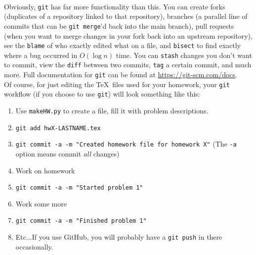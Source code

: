 \documentclass[a4paper,10pt]{article}
\begin{document}
\\[10pt]
Obviously, \texttt{git} has far more functionality than this. You can create forks (duplicates of a repository linked to that repository), branches (a parallel line of commits that can be \texttt{git merge}'d back into the main branch), pull requests (when you want to merge changes in your fork back into an upstream repository), see the \texttt{blame} of who exactly edited what on a file, and \texttt{bisect} to find exactly where a bug occurred in $O(\log n)$ time. You can \texttt{stash} changes you don't want to commit, view the \texttt{diff} between two commits, \texttt{tag} a certain commit, and much more. Full documentation for \texttt{git} can be found at \url{https://git-scm.com/docs}.
\\[10pt]
Of course, for just editing the \TeX\ files used for your homework, your \texttt{git} workflow (if you choose to use \texttt{git}) will look something like this:

\begin{enumerate}
	\item Use \texttt{makeHW.py} to create a file, fill it with problem descriptions.
	\item \texttt{git add hwX-LASTNAME.tex}
	\item \texttt{git commit -a -m "Created homework file for homework X"} (The \texttt{-a} option means commit \emph{all} changes)
	\item Work on homework
	\item \texttt{git commit -a -m "Started problem 1"}
	\item Work some more
	\item \texttt{git commit -a -m "Finished problem 1"}
	\item Etc...If you use GitHub, you will probably have a \texttt{git push} in there occasionally.
\end{enumerate}
\end{document}
